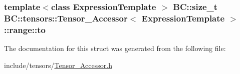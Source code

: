 \subsubsection[{\texorpdfstring{to}{to}}]{\setlength{\rightskip}{0pt plus 5cm}template$<$class Expression\+Template $>$ {\bf B\+C\+::size\+\_\+t} {\bf B\+C\+::tensors\+::\+Tensor\+\_\+\+Accessor}$<$ Expression\+Template $>$\+::range\+::to}\hypertarget{structBC_1_1tensors_1_1Tensor__Accessor_1_1range_a907988ad0fab013140ea8b1d59861d9d}{}\label{structBC_1_1tensors_1_1Tensor__Accessor_1_1range_a907988ad0fab013140ea8b1d59861d9d}


The documentation for this struct was generated from the following file\+:\begin{DoxyCompactItemize}
\item 
include/tensors/\hyperlink{Tensor__Accessor_8h}{Tensor\+\_\+\+Accessor.\+h}\end{DoxyCompactItemize}
